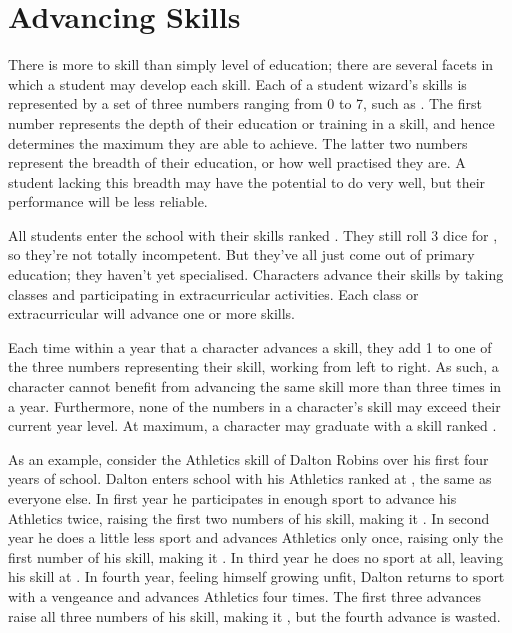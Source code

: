 \section{Advancing Skills}

There is more to skill than simply level of education; there are several facets in which a student may develop each skill.
Each of a student wizard's skills is represented by a set of three numbers ranging from 0 to 7, such as .
The first number represents the depth of their education or training in a skill, and hence determines the maximum they are able to achieve.
The latter two numbers represent the breadth of their education, or how well practised they are.
A student lacking this breadth may have the potential to do very well, but their performance will be less reliable.

All students enter the school with their skills ranked .
They still roll 3 dice for {\tests}, so they're not totally incompetent.
But they've all just come out of primary education; they haven't yet specialised.
Characters advance their skills by taking classes and participating in extracurricular activities.
Each class or extracurricular will advance one or more skills.

Each time within a year that a character advances a skill, they add 1 to one of the three numbers representing their skill, working from left to right.
As such, a character cannot benefit from advancing the same skill more than three times in a year.
Furthermore, none of the numbers in a character's skill may exceed their current year level.
At maximum, a character may graduate with a skill ranked .

As an example, consider the Athletics skill of Dalton Robins over his first four years of school.
Dalton enters school with his Athletics ranked at , the same as everyone else.
In first year he participates in enough sport to advance his Athletics twice, raising the first two numbers of his skill, making it .
In second year he does a little less sport and advances Athletics only once, raising only the first number of his skill, making it .
In third year he does no sport at all, leaving his skill at .
In fourth year, feeling himself growing unfit, Dalton returns to sport with a vengeance and advances Athletics four times.
The first three advances raise all three numbers of his skill, making it , but the fourth advance is wasted.

